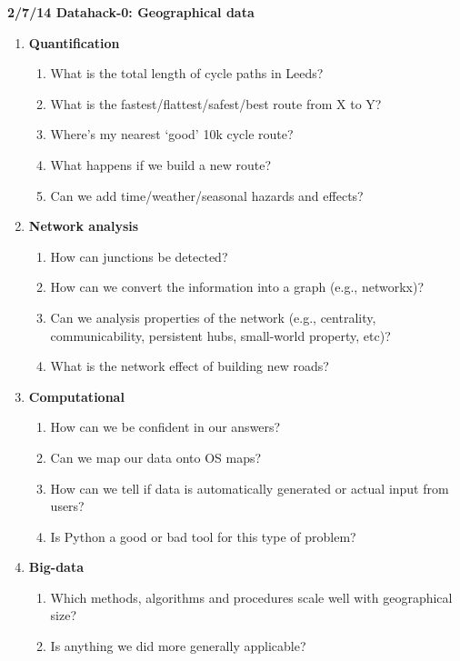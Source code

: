 \documentclass[12pt]{article}
\begin{document}
\thispagestyle{empty}

\Large{
\begin{center}
{\bf 2/7/14 Datahack-0: Geographical data}
\end{center}

\begin{enumerate}

\item {\bf Quantification}
\begin{enumerate}
\item What is the total length of cycle paths in Leeds?
\item What is the fastest/flattest/safest/best route from X to Y?
\item Where's my nearest `good' 10k cycle route?
\item What happens if we build a new route?
\item Can we add time/weather/seasonal hazards and effects?
\end{enumerate}

\item {\bf Network analysis}

\begin{enumerate}
\item How can junctions be detected?
\item How can we convert the information into a graph (e.g., networkx)?
\item Can we analysis properties of the network (e.g., centrality, communicability, persistent hubs, small-world property, etc)?
\item What is the network effect of building new roads?
\end{enumerate}

\item {\bf Computational}

\begin{enumerate}
\item How can we be confident in our answers?
\item Can we map our data onto OS maps?
\item How can we tell if data is automatically generated or actual input from users?
\item Is Python a good or bad tool for this type of problem?
\end{enumerate}

\item {\bf Big-data}


\begin{enumerate}
\item Which methods, algorithms and procedures scale well with geographical size?
\item Is anything we did more generally applicable?
\end{enumerate}

\end{enumerate}
}
\end{document}
